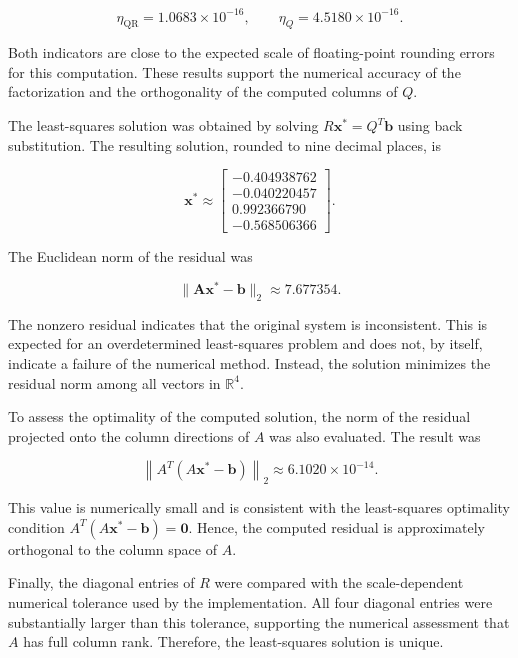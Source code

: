 \begin{equation}
    \eta_{\mathrm{QR}}=1.0683\times10^{-16},
    \qquad
    \eta_Q=4.5180\times10^{-16}.
\end{equation}

Both indicators are close to the expected scale of floating-point
rounding errors for this computation. These results support the
numerical accuracy of the factorization and the orthogonality of
the computed columns of $Q$.

The least-squares solution was obtained by solving
$R\mathbf{x}^{*}=Q^T\mathbf{b}$ using back substitution. The
resulting solution, rounded to nine decimal places, is

\begin{equation}
    \mathbf{x}^{*}\approx
    \begin{bmatrix}
        -0.404938762 \\
        -0.040220457 \\
        0.992366790  \\
        -0.568506366
    \end{bmatrix}.
    \label{eq:computed-solution}
\end{equation}

The Euclidean norm of the residual was

\begin{equation}
    \|\mathbf{A}\mathbf{x}^{*}-\mathbf{b}\|_2
    \approx 7.677354.
\end{equation}

The nonzero residual indicates that the original system is
inconsistent. This is expected for an overdetermined least-squares
problem and does not, by itself, indicate a failure of the numerical
method. Instead, the solution minimizes the residual norm among
all vectors in $\mathbb{R}^4$.

To assess the optimality of the computed solution, the norm of
the residual projected onto the column directions of $A$ was also
evaluated. The result was

\begin{equation}
    \left\|A^T(A\mathbf{x}^{*}-\mathbf{b})\right\|_2
    \approx 6.1020\times10^{-14}.
\end{equation}

This value is numerically small and is consistent with the
least-squares optimality condition $A^T(A\mathbf{x}^{*}-\mathbf{b})
    =\mathbf{0}$. Hence, the computed residual is approximately
orthogonal to the column space of $A$.

Finally, the diagonal entries of $R$ were compared with the
scale-dependent numerical tolerance used by the implementation.
All four diagonal entries were substantially larger than this
tolerance, supporting the numerical assessment that $A$ has full
column rank. Therefore, the least-squares solution is unique.

